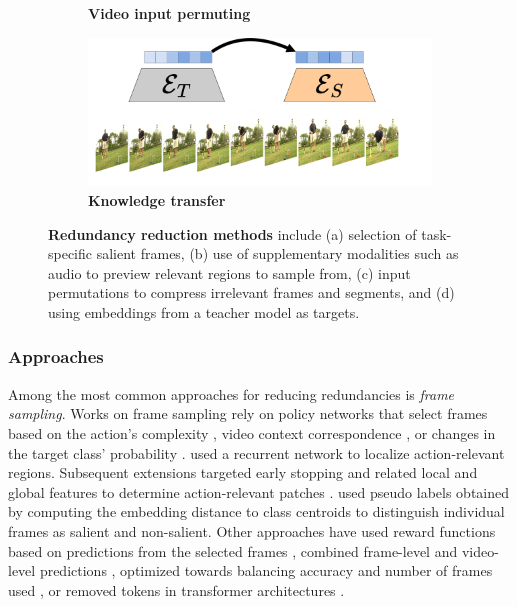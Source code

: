 \begin{figure}[t]
\begin{subfigure}[b]{0.49\linewidth}
         \caption{\textbf{Video input permuting}}
         \label{fig:redundancies_reduction::permute}
     \end{subfigure}
     \hfill
     \begin{subfigure}[b]{0.49\linewidth}
         \centering
         \includegraphics[width=\linewidth]{figs/redundancies_reduction/redudancies_transfer.pdf}
         \caption{\textbf{Knowledge transfer}}
         \label{fig:redundancies_reduction::transfer}
     \end{subfigure}
        \caption{\textbf{Redundancy reduction methods} include (a) selection of task-specific salient frames, (b) use of supplementary modalities such as audio to preview relevant regions to sample from, (c) input permutations to compress irrelevant frames and segments, and (d) using embeddings from a teacher model as targets.}
        \label{fig:redundancies_reduction}
\end{figure}



\subsubsection{Approaches}

Among the most common approaches for reducing redundancies is \emph{frame sampling}. Works on frame sampling rely on policy networks that select frames based on the action's complexity \citep{ghodrati2021frameexit,yeung2016end}, video context correspondence \citep{wu2019adaframe}, or changes in the target class' probability \citep{korbar2019scsampler}. \citet{wang2021adaptive} used a recurrent network to localize action-relevant regions. Subsequent extensions targeted early stopping \citep{wang2022adafocus} and related local and global features to determine action-relevant patches \citep{wang2022adafocusv3}. \citet{xia2022nsnet} used pseudo labels obtained by computing the embedding distance to class centroids to distinguish individual frames as salient and non-salient. Other approaches have used reward functions based on predictions from the selected frames \citep{wu2020dynamic}, combined frame-level and video-level predictions \citep{gowda2021smart}, optimized towards balancing accuracy and number of frames used \citep{wu2019liteeval}, or removed tokens in transformer architectures \citep{wu2024haltingvt}. %

